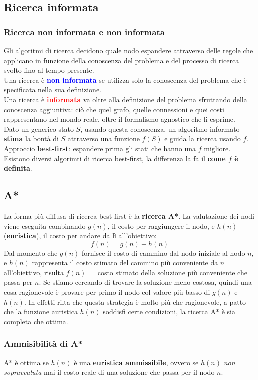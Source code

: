 \documentclass{article}
\begin{document}
\subsection{Ricerca informata}
\subsubsection{Ricerca non informata e non informata}
Gli algoritmi di ricerca decidono quale nodo espandere attraverso delle regole che applicano in funzione della conoscenza del problema e del processo di ricerca svolto fino al tempo presente.
\\ Una ricerca è \textcolor{blue}{\textbf{non informata}} se utilizza solo la conoscenza del problema che è specificata nella sua definizione.
\\ Una ricerca è \textcolor{red}{\textbf{informata}} va oltre alla definizione del problema sfruttando della conoscenza aggiuntiva: ciò che quel grafo, quelle connessioni e quei costi rappresentano nel mondo reale, oltre il formalismo agnostico che li esprime. 
\\ Dato un generico stato $S$, usando questa conoscenza, un algoritmo informato \textbf{stima} la bontà di $S$ attraverso una funzione $f(S)$ e guida la ricerca usando $f$.
\\Approccio \textbf{best-first}: espandere prima gli stati che hanno una $f$ migliore.
\\ Esistono diversi algorimti di ricerca best-first, la differenza la fa il \textbf{come $f$ è definita}.
\subsection{A*}
La forma più diffusa di ricerca best-first è la \textbf{ricerca A*}. La valutazione dei nodi viene eseguita combinando $g(n)$, il costo per raggiungere il nodo, e $h(n)$ (\textbf{euristica}), il costo per andare da lì all'obiettivo:
\[f(n)=g(n)+h(n)\]
Dal momento che $g(n)$ fornisce il costo di cammino dal nodo iniziale al nodo $n$, e $h(n)$ rappresenta il costo stimato del cammino più conveniente da $n$ all'obiettivo, risulta $f(n) = $ costo stimato della soluzione più conveniente che passa per $n$.
Se stiamo cercando di trovare la soluzione meno costosa, quindi una cosa ragionevole è provare per primo il nodo col valore più basso di $g(n)$ e $h(n)$. In effetti rilta che questa strategia è molto più che ragionevole, a patto che la funzione auristica $h(n)$
soddisfi certe condizioni, la ricerca A* è sia completa che ottima.
\subsubsection{Ammisibilità di A*}
A* è ottima se $h(n)$ è una \textbf{euristica ammissibile}, ovvero se $h(n)$ \textit{non sopravvaluta} mai il costo reale di una soluzione che passa per il nodo $n$.
\end{document}
